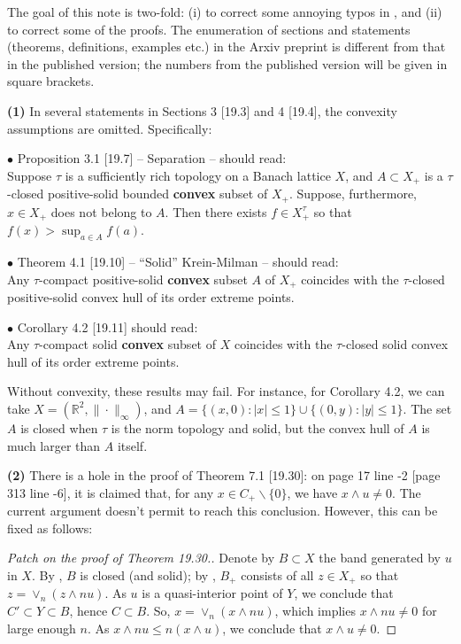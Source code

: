 \documentclass[11pt]{amsart}
\theoremstyle{definition}
\newcommand{\R}{\mathbb{R}}
\begin{document}
The goal of this note is two-fold: (i) to correct some annoying typos in \cite{OiTu}, and (ii) to correct some of the proofs. The enumeration of sections and statements (theorems, definitions, examples etc.) in the Arxiv preprint is different from that in the published version; the numbers from the published version will be given in square brackets.


{\bf (1)} In several statements in Sections 3 [19.3] and 4 [19.4], the convexity assumptions are omitted. Specifically:

$\bullet$ Proposition 3.1 [19.7] -- Separation -- should read: \\
Suppose $\tau$ is a sufficiently rich topology on a Banach lattice $X$, and $A \subset X_+$ is a $\tau$-closed positive-solid bounded {\bf convex} subset of $X_+$. Suppose, furthermore, $x \in X_+$ does not belong to $A$. Then there exists $f \in X^\tau_+$ so that $f(x) > \sup_{a \in A} f(a)$.

$\bullet$ Theorem 4.1 [19.10] -- ``Solid'' Krein-Milman -- should read: \\
Any $\tau$-compact positive-solid {\bf convex} subset $A$ of $X_+$ coincides with the $\tau$-closed positive-solid convex hull of its order extreme points.

$\bullet$ Corollary 4.2 [19.11] should read: \\
Any $\tau$-compact solid {\bf convex} subset of $X$ coincides with the $\tau$-closed solid convex hull of its order extreme points.

Without convexity, these results may fail. For instance, for Corollary 4.2, we can take $X = (\R^2, \| \cdot \|_\infty)$, and $A = \{(x,0) : |x| \leq 1\} \cup \{(0,y) : |y| \leq 1\}$. The set $A$ is closed when $\tau$ is the norm topology and solid, but the convex hull of $A$ is much larger than $A$ itself.

{\bf (2)} There is a hole in the proof of Theorem 7.1 [19.30]: on page 17 line -2 [page 313 line -6], it is claimed that, for any $x \in C_+ \backslash \{0\}$, we have $x \wedge u \neq 0$. The current argument doesn't permit to reach this conclusion. However, this can be fixed as follows:

\begin{proof}[Patch on the proof of Theorem 19.30.]
Denote by $B \subset X$ the band generated by $u$ in $X$. By \cite[Proposition 1.2.3]{M-N}, $B$ is closed (and solid); by \cite[Proposition 1.2.3]{M-N}, $B_+$ consists of all $z \in X_+$ so that $z = \vee_n (z \wedge nu)$.
As $u$ is a quasi-interior point of $Y$, we conclude that $C' \subset Y \subset B$, hence $C \subset B$. So, $x = \vee_n (x \wedge nu)$, which implies $x \wedge nu \neq 0$ for large enough $n$. As $x \wedge nu \leq n (x \wedge u)$, we conclude that $x \wedge u \neq 0$.
%
\end{proof}
\end{document}
